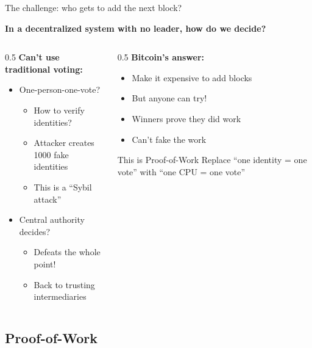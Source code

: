 \ifdefined\PRESENTATION\else\PassOptionsToClass{handout}{beamer}\fi\documentclass[aspectratio=169, lualatex]{beamer}
\begin{document}
\begin{frame}{The challenge: who gets to add the next block?}
	\begin{center}
		\textbf{In a decentralized system with no leader, how do we decide?}
	\end{center}
	\begin{columns}[c]
		\begin{column}{0.5\textwidth}
			\textbf{Can't use traditional voting:}
			\begin{itemize}
				\item One-person-one-vote?
				      \begin{itemize}
					      \item How to verify identities?
					      \item Attacker creates 1000 fake identities
					      \item This is a ``Sybil attack''
				      \end{itemize}
				\item Central authority decides?
				      \begin{itemize}
					      \item Defeats the whole point!
					      \item Back to trusting intermediaries
				      \end{itemize}
			\end{itemize}
		\end{column}
		\begin{column}{0.5\textwidth}
			\textbf{Bitcoin's answer:}
			\begin{itemize}
				\item Make it expensive to add blocks
				\item But anyone can try!
				\item Winners prove they did work
				\item Can't fake the work
			\end{itemize}
			\begin{exampleblock}{This is Proof-of-Work}
				Replace ``one identity = one vote'' with ``one CPU = one vote''
			\end{exampleblock}
		\end{column}
	\end{columns}
\end{frame}

\subsection{Proof-of-Work}
\end{document}
